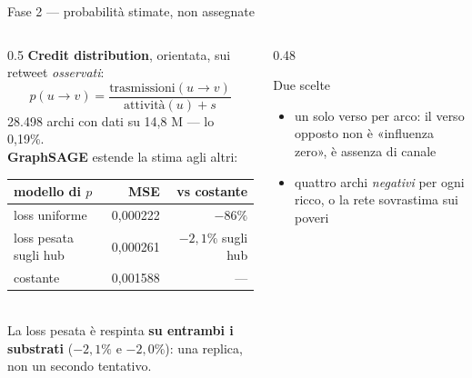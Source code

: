 \documentclass[aspectratio=169,10pt]{beamer}
\newcommand{\male}[1]{{\color{bordeaux}#1}}
\newcommand{\pos}[1]{{\color{petrolioscuro}#1}}
\begin{document}
\begin{frame}{Fase 2 --- probabilit\`a stimate, non assegnate}
  \begin{columns}[T]
    \begin{column}{0.5\textwidth}
      \small
      \textbf{Credit distribution}, orientata, sui retweet \emph{osservati}:
      \[
        p(u \to v) = \frac{\text{trasmissioni}(u \to v)}{\text{attivit\`a}(u) + s}
      \]
      28.498 archi con dati su 14,8 M --- lo 0,19\%.\\[0.6em]
      \textbf{GraphSAGE} estende la stima agli altri:\\[0.3em]
      \begin{tabular}{@{}lrr@{}}
        \toprule
        modello di $p$ & MSE & vs costante \\
        \midrule
        loss uniforme & 0,000222 & \pos{$-86\%$} \\
        loss pesata sugli hub & 0,000261 & \male{$-2{,}1\%$ sugli hub} \\
        costante & 0,001588 & --- \\
        \bottomrule
      \end{tabular}\\[0.5em]
      La loss pesata \`e respinta \textbf{su entrambi i substrati} ($-2{,}1\%$ e $-2{,}0\%$): una replica, non un secondo tentativo.
    \end{column}
    \begin{column}{0.48\textwidth}
      \begin{block}{Due scelte}
        \small
        \begin{itemize}
          \item un solo verso per arco: il verso opposto non \`e «influenza zero», \`e assenza di canale
          \item quattro archi \emph{negativi} per ogni ricco, o la rete sovrastima sui poveri
        \end{itemize}
      \end{block}
    \end{column}
  \end{columns}
\end{frame}
\end{document}
